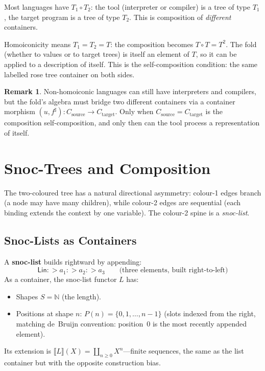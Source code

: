 \documentclass[11pt,a4paper]{article}
\theoremstyle{definition}
\newtheorem{remark}[definition]{Remark}
\theoremstyle{plain}
\newcommand{\Ext}[1]{\llbracket #1 \rrbracket}
\begin{document}
Most languages have $T_1 \circ T_2$: the tool (interpreter or
compiler) is a tree of type $T_1$, the target program is a tree of
type $T_2$. This is composition of \emph{different} containers.

Homoiconicity means $T_1 = T_2 = T$: the composition becomes
$T \circ T = T^2$. The fold (whether to values or to target trees)
is itself an element of $T$, so it can be applied to a description of
itself. This is the self-composition condition: the same labelled rose
tree container on both sides.

\begin{remark}
Non-homoiconic languages can still have interpreters and compilers,
but the fold's algebra must bridge two different containers via a
container morphism $(u, f^\sharp) : C_{\text{source}} \to
C_{\text{target}}$. Only when $C_{\text{source}} =
C_{\text{target}}$ is the composition self-composition, and only
then can the tool process a representation of itself.
\end{remark}

\section{Snoc-Trees and Composition}

The two-coloured tree has a natural directional asymmetry: colour-1
edges branch (a node may have many children), while colour-2 edges
are sequential (each binding extends the context by one variable).
The colour-2 spine is a \emph{snoc-list}.

\subsection{Snoc-Lists as Containers}

A \textbf{snoc-list} builds rightward by appending:
\[
\mathsf{Lin} \mathbin{{:}{>}} a_1 \mathbin{{:}{>}} a_2
  \mathbin{{:}{>}} a_3
\qquad\text{(three elements, built right-to-left)}
\]
As a container, the snoc-list functor $L$ has:
\begin{itemize}[nosep]
\item Shapes $S = \mathbb{N}$ (the length).
\item Positions at shape $n$: $P(n) = \{0, 1, \ldots, n-1\}$ (slots
  indexed from the right, matching de~Bruijn convention: position~0
  is the most recently appended element).
\end{itemize}
Its extension is $\Ext{L}(X) = \coprod_{n \geq 0} X^n$---finite
sequences, the same as the list container but with the opposite
construction bias.
\end{document}
